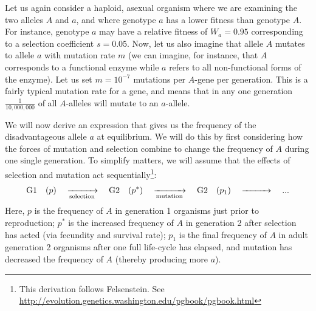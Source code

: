 \documentclass[11pt,a4paper]{book}
\begin{document}
Let us again consider a haploid, asexual organism where we are examining the two alleles $A$ and $a$, and  where genotype $a$ has a lower fitness than genotype $A$.  For instance, genotype $a$ may  have a relative fitness of $W_a=0.95$  corresponding to a selection coefficient $s=0.05$. Now, let us also imagine that allele $A$ mutates to allele $a$ with mutation rate $m$ (we can imagine, for instance, that $A$ corresponds to a functional enzyme while $a$ refers to all non-functional forms of the enzyme). Let us set $m=10^{-7}$ mutations per $A$-gene per generation. This is a fairly typical mutation rate for a gene, and  means that in any one generation $\frac{1}{10,000,000}$ of all $A$-alleles will mutate to an $a$-allele. 

We will now derive an expression that gives us the frequency of the disadvantageous allele $a$ at equilibrium. We will do this by first considering how the forces of mutation and selection combine to change the frequency of $A$ during one single generation. To simplify matters, we will assume that the effects of selection and mutation act sequentially\footnote{This derivation follows Felsenstein. See \url{http://evolution.genetics.washington.edu/pgbook/pgbook.html}}:
\begin{equation*}
\text{G1} \quad (p) \quad \xrightarrow[\text{selection}]{}\quad  \text{G2} \quad (p^*) \quad  \xrightarrow[\text{mutation}]{}\quad  \text{G2} \quad (p_1)\quad \xrightarrow[\hspace{10mm}]{}\quad ...
\end{equation*}
%
Here, $p$ is the frequency of $A$ in generation 1 organisms just prior to reproduction; $p^*$ is the increased frequency of $A$ in generation 2 after selection has acted (via fecundity and survival rate); $p_1$ is the final frequency of $A$ in adult generation 2 organisms after one full life-cycle has elapsed, and mutation has decreased the frequency of $A$ (thereby producing more $a$). 
\end{document}
